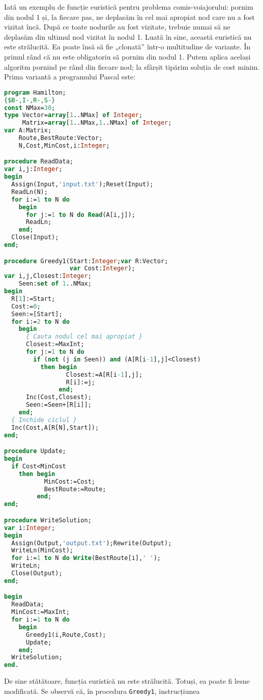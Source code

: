Iată un exemplu de funcție euristică pentru problema comis-voiajorului: pornim
din nodul 1 și, la fiecare pas, ne deplasăm în cel mai apropiat nod care nu a
fost vizitat încă. După ce toate nodurile au fost vizitate, trebuie numai să
ne deplasăm din ultimul nod vizitat în nodul 1. Luată în sine, această
euristică nu este strălucită. Ea poate însă să fie „clonată” într-o
multitudine de variante. În primul rând că nu este obligatoriu să pornim din
nodul 1. Putem aplica același algoritm pornind pe rând din fiecare nod; la
sfârșit tipărim soluția de cost minim. Prima variantă a programului Pascal
este:

\begin{lstlisting}[language=Pascal]
program Hamilton;
{$B-,I-,R-,S-}
const NMax=30;
type Vector=array[1..NMax] of Integer;
     Matrix=array[1..NMax,1..NMax] of Integer;
var A:Matrix;
    Route,BestRoute:Vector;
    N,Cost,MinCost,i:Integer;

procedure ReadData;
var i,j:Integer;
begin
  Assign(Input,'input.txt');Reset(Input);
  ReadLn(N);
  for i:=1 to N do
    begin
      for j:=1 to N do Read(A[i,j]);
      ReadLn;
    end;
  Close(Input);
end;

procedure Greedy1(Start:Integer;var R:Vector;
                  var Cost:Integer);
var i,j,Closest:Integer;
    Seen:set of 1..NMax;
begin
  R[1]:=Start;
  Cost:=0;
  Seen:=[Start];
  for i:=2 to N do
    begin
      { Cauta nodul cel mai apropiat }
      Closest:=MaxInt;
      for j:=1 to N do
        if (not (j in Seen)) and (A[R[i-1],j]<Closest)
          then begin
                 Closest:=A[R[i-1],j];
                 R[i]:=j;
               end;
      Inc(Cost,Closest);
      Seen:=Seen+[R[i]];
    end;
  { Inchide ciclul }
  Inc(Cost,A[R[N],Start]);
end;

procedure Update;
begin
  if Cost<MinCost
    then begin
           MinCost:=Cost;
           BestRoute:=Route;
         end;
end;

procedure WriteSolution;
var i:Integer;
begin
  Assign(Output,'output.txt');Rewrite(Output);
  WriteLn(MinCost);
  for i:=1 to N do Write(BestRoute[i],' ');
  WriteLn;
  Close(Output);
end;

begin
  ReadData;
  MinCost:=MaxInt;
  for i:=1 to N do
    begin
      Greedy1(i,Route,Cost);
      Update;
    end;
  WriteSolution;
end.
\end{lstlisting}

De sine stătătoare, funcția euristică nu este strălucită. Totuși, ea poate fi
lesne modificată. Se observă că, în procedura {\tt Greedy1}, instrucțiunea

